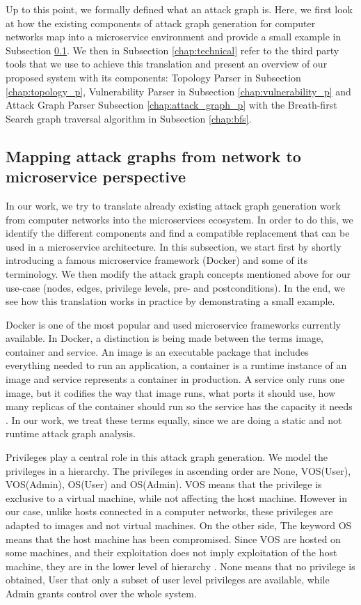 Up to this point, we formally defined what an attack graph is. Here, we first look at how the existing components of attack graph generation for computer networks map into a microservice environment and provide a small example in Subsection \ref{chap:mapping}. We then in Subsection \ref{chap:technical} refer to the third party tools that we use to achieve this translation and present an overview of our proposed system with its components: Topology Parser in Subsection \ref{chap:topology_p}, Vulnerability Parser in Subsection \ref{chap:vulnerability_p} and Attack Graph Parser Subsection \ref{chap:attack_graph_p} with the Breath-first Search graph traversal algorithm in Subsection \ref{chap:bfs}. 

\subsection{Mapping attack graphs from network to microservice perspective}
\label{chap:mapping}

In our work, we try to translate already existing attack graph generation work from computer networks into the microservices ecosystem. In order to do this, we identify the different components and find a compatible replacement that can be used in a microservice architecture. In this subsection, we start first by shortly introducing a famous microservice framework (Docker) and some of its terminology. We then modify the attack graph concepts mentioned above for our use-case (nodes, edges, privilege levels, pre- and postconditions). In the end, we see how this translation works in practice by demonstrating a small example.

Docker is one of the most popular and used microservice frameworks currently available. In Docker, a distinction is being made between the terms image, container and service. An image is an executable package that includes everything needed to run an application, a container is a runtime instance of an image and service represents a container in production. A service only runs one image, but it codifies the way that image runs, what ports it should use, how many replicas of the container should run so the service has the capacity it needs \cite{merkel2014docker}. In our work, we treat these terms equally, since we are doing a static and not runtime attack graph analysis.

Privileges play a central role in this attack graph generation. We model the privileges in a hierarchy. The privileges in ascending order are None, VOS(User), VOS(Admin), OS(User) and OS(Admin). VOS means that the privilege is exclusive to a virtual machine, while not affecting the host machine. However in our case, unlike hosts connected in a computer networks, these privileges are adapted to images and not virtual machines. On the other side, The keyword OS means that the host machine has been compromised. Since VOS are hosted on some machines, and their exploitation does not imply exploitation of the host machine, they are in the lower level of hierarchy \cite{aksu2018automated}. None means that no privilege is obtained, User that only a subset of user level privileges are available, while Admin grants control over the whole system.

